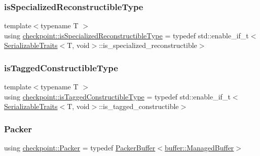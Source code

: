 \mbox{\label{namespacecheckpoint_a30b2672bbbe0c21d2b88edb1ddaec19a}} 
\subsubsection{\texorpdfstring{is\+Specialized\+Reconstructible\+Type}{isSpecializedReconstructibleType}}
{\footnotesize\ttfamily template$<$typename T $>$ \\
using \hyperlink{namespacecheckpoint_a30b2672bbbe0c21d2b88edb1ddaec19a}{checkpoint\+::is\+Specialized\+Reconstructible\+Type} = typedef std\+::enable\+\_\+if\+\_\+t$<$\hyperlink{structcheckpoint_1_1_serializable_traits}{Serializable\+Traits}$<$T, void$>$\+::is\+\_\+specialized\+\_\+reconstructible$>$}

\mbox{\label{namespacecheckpoint_abff0f367c546c94ce857d200153d990f}} 
\subsubsection{\texorpdfstring{is\+Tagged\+Constructible\+Type}{isTaggedConstructibleType}}
{\footnotesize\ttfamily template$<$typename T $>$ \\
using \hyperlink{namespacecheckpoint_abff0f367c546c94ce857d200153d990f}{checkpoint\+::is\+Tagged\+Constructible\+Type} = typedef std\+::enable\+\_\+if\+\_\+t$<$\hyperlink{structcheckpoint_1_1_serializable_traits}{Serializable\+Traits}$<$T, void$>$\+::is\+\_\+tagged\+\_\+constructible$>$}

\mbox{\label{namespacecheckpoint_ad744c208c7b1da6ee19c10d071e74f7d}} 
\subsubsection{\texorpdfstring{Packer}{Packer}}
{\footnotesize\ttfamily using \hyperlink{namespacecheckpoint_ad744c208c7b1da6ee19c10d071e74f7d}{checkpoint\+::\+Packer} = typedef \hyperlink{structcheckpoint_1_1_packer_buffer}{Packer\+Buffer}$<$\hyperlink{structcheckpoint_1_1buffer_1_1_managed_buffer}{buffer\+::\+Managed\+Buffer}$>$}

